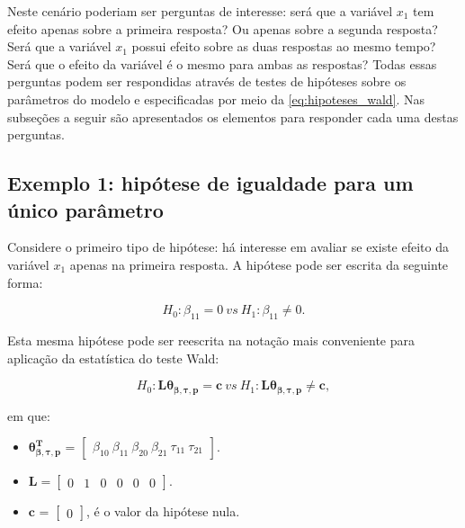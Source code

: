 Neste cenário poderiam ser perguntas de interesse: será que a variável $x_1$ tem efeito apenas sobre a primeira resposta? Ou apenas sobre a segunda resposta? Será que a variável $x_1$ possui efeito sobre as duas respostas ao mesmo tempo? Será que o efeito da variável é o mesmo para ambas as respostas? Todas essas perguntas podem ser respondidas através de testes de hipóteses sobre os parâmetros do modelo e especificadas por meio da \autoref{eq:hipoteses_wald}. Nas subseções a seguir são apresentados os elementos para responder cada uma destas perguntas. 

\subsection{Exemplo 1: hipótese de igualdade para um único parâmetro}

Considere o primeiro tipo de hipótese: há interesse em avaliar se existe efeito da variável $x_1$ apenas na primeira resposta. A hipótese pode ser escrita da seguinte forma:

\begin{equation}
H_0: \beta_{11} = 0 \ vs \ H_1: \beta_{11} \neq 0.
\end{equation}

Esta mesma hipótese pode ser reescrita na notação mais conveniente para aplicação da estatística do teste Wald:

\begin{equation}
H_0: \boldsymbol{L}\boldsymbol{\theta_{\beta,\tau,p}} = \boldsymbol{c} \ vs \ H_1: \boldsymbol{L}\boldsymbol{\theta_{\beta,\tau,p}} \neq \boldsymbol{c},
\end{equation}

\noindent em que:

\begin{itemize}
  
  \item $\boldsymbol{\theta_{\beta,\tau,p}^T}$ = $\begin{bmatrix} \beta_{10} \  \beta_{11} \ \beta_{20} \ \beta_{21} \ \tau_{11} \ \tau_{21} \end{bmatrix}$.


\item $\boldsymbol{L} = \begin{bmatrix} 0 & 1 & 0 & 0 & 0 & 0  \end{bmatrix}.$
 
\item $\boldsymbol{c}$ = $\begin{bmatrix} 0 \end{bmatrix}$, é o valor da hipótese nula. 

\end{itemize}

